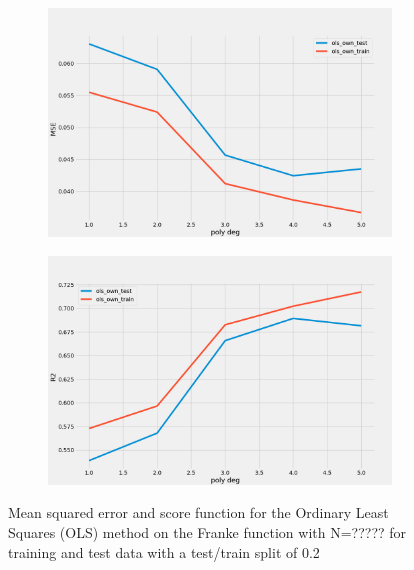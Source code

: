 \begin{figure}
     \centering
     \begin{subfigure}[b]{0.5\textwidth}
         \centering
         \includegraphics[width=\textwidth]{Figures/b_mse.png}
     \end{subfigure}%
     \hfill
     \begin{subfigure}[b]{0.5\textwidth}
         \centering
         \includegraphics[width=\textwidth]{Figures/b_r2.png}
     \end{subfigure}
        \caption{Mean squared error and score function for the Ordinary Least Squares (OLS) method on the Franke function with N=????? for training and test data with a test/train split of 0.2}
        \label{fig:mse_and_score_franke}
\end{figure}

